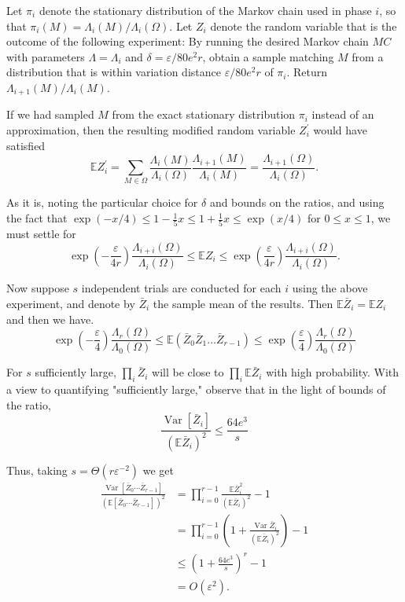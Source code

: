\begin{flushleft}
	Let $\pi_i$ denote the stationary distribution of the Markov chain used in phase $i$, so that $\pi_i(M)=\Lambda_i(M) / \Lambda_i(\Omega)$. Let $Z_i$ denote the random variable that is the outcome of the following experiment:
	By running the desired Markov chain $M C$  with parameters $\Lambda=\Lambda_i$ and $\delta=\varepsilon / 80 e^2 r$, obtain a sample matching $M$ from a distribution that is within variation distance $\varepsilon / 80 e^2 r$ of $\pi_i$.
	Return $\Lambda_{i+1}(M) / \Lambda_i(M)$.
	
	If we had sampled $M$ from the exact stationary distribution $\pi_i$ instead of an approximation, then the resulting modified random variable $Z_i^{\prime}$ would have satisfied
	$$
	\mathbb{E} Z_i^{\prime}=\sum_{M \in \Omega} \frac{\Lambda_i(M)}{\Lambda_i(\Omega)} \frac{\Lambda_{i+1}(M)}{\Lambda_i(M)}=\frac{\Lambda_{i+1}(\Omega)}{\Lambda_i(\Omega)} .
	$$
	
	As it is, noting the particular choice for $\delta$ and bounds on the ratios, and using the fact that $\exp (-x / 4) \leq 1-\frac{1}{5} x \leq 1+\frac{1}{5} x \leq \exp (x / 4)$ for $0 \leq x \leq 1$, we must settle for
	$$
	\exp \left(-\frac{\varepsilon}{4 r}\right) \frac{\Lambda_{i+i}(\Omega)}{\Lambda_i(\Omega)} \leq \mathbb{E} Z_i \leq \exp \left(\frac{\varepsilon}{4 r}\right) \frac{\Lambda_{i+i}(\Omega)}{\Lambda_i(\Omega)} .
	$$
	
	Now suppose $s$ independent trials are conducted for each $i$ using the above experiment, and denote by $\bar{Z}_i$ the sample mean of the results. Then $\mathbb{E} \bar{Z}_i=\mathbb{E} Z_i$ and then we have.
	$$
	\exp \left(-\frac{\varepsilon}{4}\right) \frac{\Lambda_r(\Omega)}{\Lambda_0(\Omega)} \leq \mathbb{E}\left(\bar{Z}_0 \bar{Z}_1 \ldots \bar{Z}_{r-1}\right) \leq \exp \left(\frac{\varepsilon}{4}\right) \frac{\Lambda_r(\Omega)}{\Lambda_0(\Omega)}
	$$
	
	For $s$ sufficiently large, $\prod_i \bar{Z}_i$ will be close to $\prod_i \mathbb{E} \bar{Z}_i$ with high probability. With a view to quantifying "sufficiently large," observe that in the light of bounds of the ratio,
	$$
	\frac{\operatorname{Var}\left[\bar{Z}_i\right]}{\left(\mathbb{E} \bar{Z}_i\right)^2} \leq \frac{64e^3}{s}
	$$
	
	Thus, taking $s=\Theta\left(r \varepsilon^{-2}\right)$ we get
	$$
	\begin{aligned}
		\frac{\operatorname{Var}\left[\bar{Z}_0 \cdots \bar{Z}_{r-1}\right]}{\left(\mathbb{E}\left[\bar{Z}_0 \cdots \bar{Z}_{r-1}\right]\right)^2} & =\prod_{i=0}^{r-1} \frac{\mathbb{E} \bar{Z}_i^2}{\left(\mathbb{E} \bar{Z}_i\right)^2}-1 \\
		& =\prod_{i=0}^{r-1}\left(1+\frac{\operatorname{Var} \bar{Z}_i}{\left(\mathbb{E} \bar{Z}_i\right)^2}\right)-1 \\
		& \leq\left(1+\frac{64e^3}{s}\right)^r-1 \\
		& =O\left(\varepsilon^2\right) .
	\end{aligned}
	$$
	

\end{flushleft}
